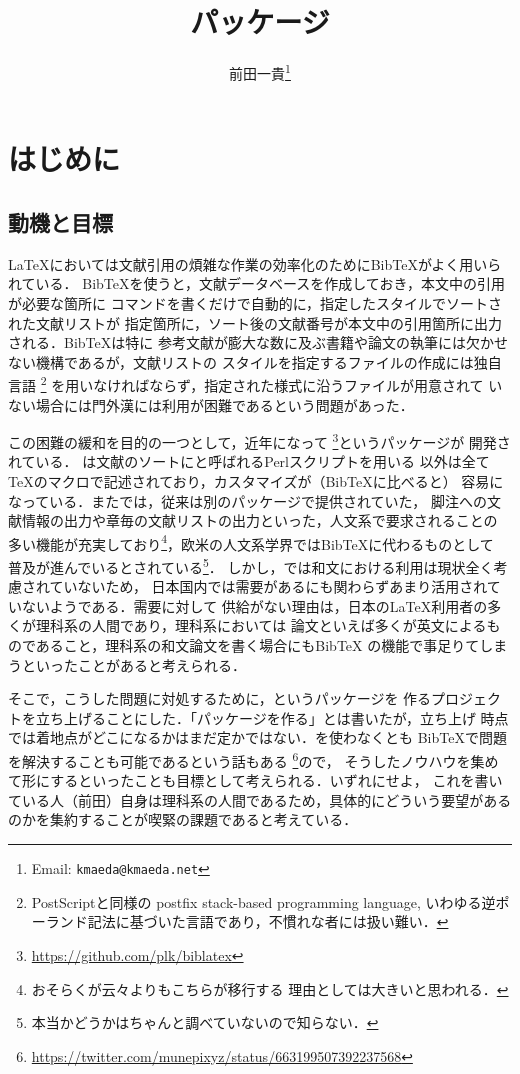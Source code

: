 \documentclass{jlreq}
\title{\bfseries\spotcolor\sty{biblatex-japanese}パッケージ}
\author{前田一貴\footnote{Email: \texttt{kmaeda@kmaeda.net}}}
\begin{document}
\maketitle

\tableofcontents

\section{はじめに}

\subsection{動機と目標}
\LaTeX においては文献引用の煩雑な作業の効率化のためにBib\TeX がよく用いられている．
Bib\TeX を使うと，文献データベースを作成しておき，本文中の引用が必要な箇所に
コマンドを書くだけで自動的に，指定したスタイルでソートされた文献リストが
指定箇所に，ソート後の文献番号が本文中の引用箇所に出力される．Bib\TeX は特に
参考文献が膨大な数に及ぶ書籍や論文の執筆には欠かせない機構であるが，文献リストの
スタイルを指定するファイルの作成には独自言語
\footnote{PostScriptと同様の postfix stack-based programming language,
  いわゆる逆ポーランド記法に基づいた言語であり，不慣れな者には扱い難い．}
を用いなければならず，指定された様式に沿うファイルが用意されて
いない場合には門外漢には利用が困難であるという問題があった．

この困難の緩和を目的の一つとして，近年になって
\footnote{\url{https://github.com/plk/biblatex}}というパッケージが
開発されている．
は文献のソートにと呼ばれるPerlスクリプトを用いる
以外は全て\TeX{}のマクロで記述されており，カスタマイズが（Bib\TeX に比べると）
容易になっている．またでは，従来は別のパッケージで提供されていた，
脚注への文献情報の出力や章毎の文献リストの出力といった，人文系で要求されることの
多い機能が充実しており\footnote{おそらくが云々よりもこちらが移行する
  理由としては大きいと思われる．}，欧米の人文系学界ではBib\TeX に代わるものとして
普及が進んでいるとされている\footnote{本当かどうかはちゃんと調べていないので知らない．}．
しかし，では和文における利用は現状全く考慮されていないため，
日本国内では需要があるにも関わらずあまり活用されていないようである．需要に対して
供給がない理由は，日本の\LaTeX 利用者の多くが理科系の人間であり，理科系においては
論文といえば多くが英文によるものであること，理科系の和文論文を書く場合にもBib\TeX
の機能で事足りてしまうといったことがあると考えられる．

そこで，こうした問題に対処するために，というパッケージを
作るプロジェクトを立ち上げることにした．「パッケージを作る」とは書いたが，立ち上げ
時点では着地点がどこになるかはまだ定かではない．を使わなくとも
Bib\TeX で問題を解決することも可能であるという話もある
\footnote{\url{https://twitter.com/munepixyz/status/663199507392237568}}ので，
そうしたノウハウを集めて形にするといったことも目標として考えられる．いずれにせよ，
これを書いている人（前田）自身は理科系の人間であるため，具体的にどういう要望がある
のかを集約することが喫緊の課題であると考えている．
\end{document}
